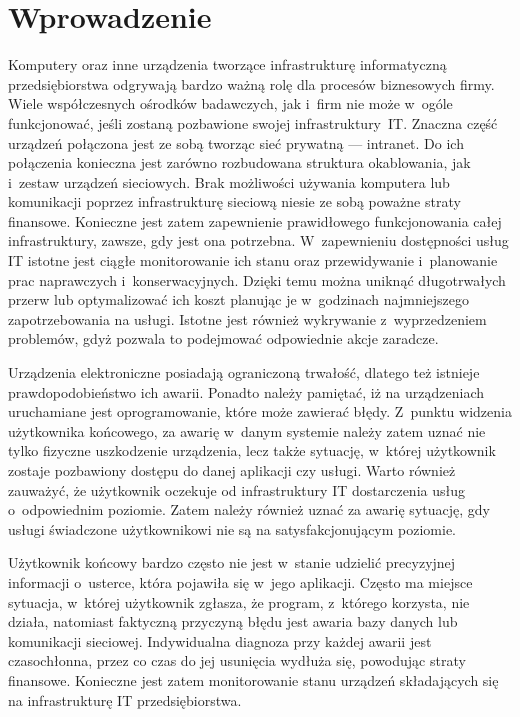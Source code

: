 \chapter{Wprowadzenie}

Komputery oraz inne urządzenia tworzące infrastrukturę informatyczną
przedsiębiorstwa odgrywają bardzo ważną rolę dla procesów biznesowych
firmy. Wiele współczesnych ośrodków badawczych, jak i~firm nie może
w~ogóle funkcjonować, jeśli zostaną pozbawione swojej
infrastruktury~IT. Znaczna część urządzeń połączona jest ze sobą
tworząc sieć prywatną --- intranet. Do ich połączenia konieczna jest
zarówno rozbudowana struktura okablowania, jak i~zestaw urządzeń
sieciowych. Brak możliwości używania komputera lub komunikacji poprzez
infrastrukturę sieciową niesie ze sobą poważne straty
finansowe. Konieczne jest zatem zapewnienie prawidłowego
funkcjonowania całej infrastruktury, zawsze, gdy jest ona
potrzebna. W~zapewnieniu dostępności usług IT istotne jest ciągłe
monitorowanie ich stanu oraz przewidywanie i~planowanie prac
naprawczych i~konserwacyjnych. Dzięki temu można uniknąć długotrwałych
przerw lub optymalizować ich koszt planując je w~godzinach
najmniejszego zapotrzebowania na usługi. Istotne jest również
wykrywanie z~wyprzedzeniem problemów, gdyż pozwala to podejmować
odpowiednie akcje zaradcze.

Urządzenia elektroniczne posiadają ograniczoną trwałość, dlatego też
istnieje prawdopodobieństwo ich awarii. Ponadto należy pamiętać, iż na
urządzeniach uruchamiane jest oprogramowanie, które może zawierać
błędy. Z~punktu widzenia użytkownika końcowego, za awarię w~danym
systemie należy zatem uznać nie tylko fizyczne uszkodzenie urządzenia,
lecz także sytuację, w~której użytkownik zostaje pozbawiony dostępu do
danej aplikacji czy usługi. Warto również zauważyć, że użytkownik
oczekuje od infrastruktury IT dostarczenia usług o~odpowiednim
poziomie. Zatem należy również uznać za awarię sytuację, gdy usługi
świadczone użytkownikowi nie są na satysfakcjonującym poziomie.

Użytkownik końcowy bardzo często nie jest w~stanie udzielić
precyzyjnej informacji o~usterce, która pojawiła się w~jego
aplikacji. Często ma miejsce sytuacja, w~której użytkownik zgłasza, że
program, z~którego korzysta, nie działa, natomiast faktyczną
przyczyną błędu jest awaria bazy danych lub komunikacji
sieciowej. Indywidualna diagnoza przy każdej awarii jest czasochłonna,
przez co czas do jej usunięcia wydłuża się, powodując straty
finansowe. Konieczne jest zatem monitorowanie stanu urządzeń
składających się na infrastrukturę IT przedsiębiorstwa.

